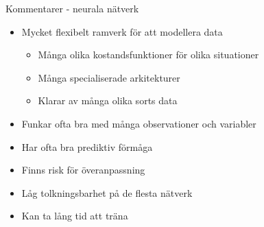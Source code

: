 \documentclass[10pt,english]{beamer}
\begin{document}
\begin{frame}{Kommentarer - neurala nätverk }
    \begin{itemize}
        \item Mycket flexibelt ramverk för att modellera data
          \begin{itemize}
            \item Många olika kostandsfunktioner för olika situationer
            \item Många specialiserade arkitekturer
            \item Klarar av många olika sorts data
          \end{itemize}
        \item Funkar ofta bra med många observationer och variabler
        \item Har ofta bra prediktiv förmåga
        \item Finns risk för överanpassning
        \item Låg tolkningsbarhet på de flesta nätverk
        \item Kan ta lång tid att träna 
    \end{itemize}
\end{frame}
\end{document}
